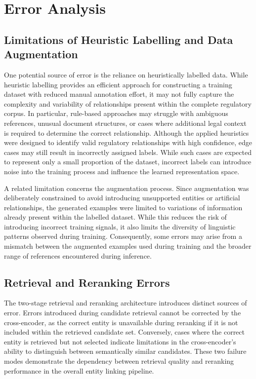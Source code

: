 \section{Error Analysis}

\subsection{Limitations of Heuristic Labelling and Data Augmentation}

One potential source of error is the reliance on heuristically labelled data. While heuristic labelling provides an efficient approach for constructing a training dataset with reduced manual annotation effort, it may not fully capture the complexity and variability of relationships present within the complete regulatory corpus. In particular, rule-based approaches may struggle with ambiguous references, unusual document structures, or cases where additional legal context is required to determine the correct relationship. Although the applied heuristics were designed to identify valid regulatory relationships with high confidence, edge cases may still result in incorrectly assigned labels. While such cases are expected to represent only a small proportion of the dataset, incorrect labels can introduce noise into the training process and influence the learned representation space.

A related limitation concerns the augmentation process. Since augmentation was deliberately constrained to avoid introducing unsupported entities or artificial relationships, the generated examples were limited to variations of information already present within the labelled dataset. While this reduces the risk of introducing incorrect training signals, it also limits the diversity of linguistic patterns observed during training. Consequently, some errors may arise from a mismatch between the augmented examples used during training and the broader range of references encountered during inference.

\subsection{Retrieval and Reranking Errors}

The two-stage retrieval and reranking architecture introduces distinct sources of error. Errors introduced during candidate retrieval cannot be corrected by the cross-encoder, as the correct entity is unavailable during reranking if it is not included within the retrieved candidate set. Conversely, cases where the correct entity is retrieved but not selected indicate limitations in the cross-encoder's ability to distinguish between semantically similar candidates. These two failure modes demonstrate the dependency between retrieval quality and reranking performance in the overall entity linking pipeline.

